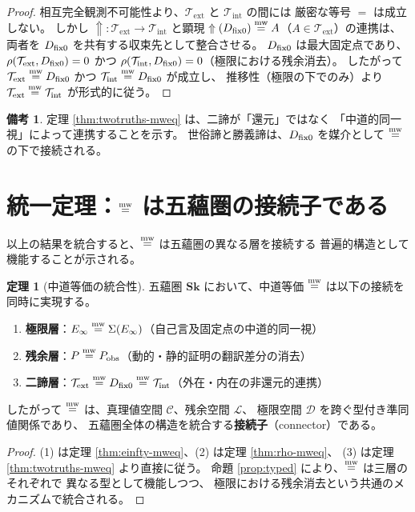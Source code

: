\documentclass[11pt,a4paper]{article}
\theoremstyle{definition}
\newtheorem{theorem}{定理}[section]
\newtheorem{remark}{備考}[section]
\newcommand{\Sk}{\mathbf{Sk}}
\newcommand{\C}{\mathcal{C}}
\newcommand{\Lspace}{\mathcal{L}}
\newcommand{\Dspace}{\mathcal{D}}
\newcommand{\T}{\mathcal{T}}
\newcommand{\TExt}{\T_{\mathrm{ext}}}
\newcommand{\TInt}{\T_{\mathrm{int}}}
\newcommand{\SelfRef}{\Sigma}
\newcommand{\Einfty}{E_{\infty}}
\begin{document}
\begin{proof}
相互完全観測不可能性より、$\TExt$ と $\TInt$ の間には
厳密な等号 $=$ は成立しない。
しかし $\Uparrow:\TExt\to\TInt$ と顕現
$\Uparrow(D_{\mathrm{fix}0})\mathrel{\overset{\mathrm{mw}}{=}} A$（$A\in\TExt$）の連携は、
両者を $D_{\mathrm{fix}0}$ を共有する収束先として整合させる。
$D_{\mathrm{fix}0}$ は最大固定点であり、
$\rho(\TExt,\dfix)=0$ かつ $\rho(\TInt,\dfix)=0$（極限における残余消去）。
したがって $\TExt\mweq\dfix$ かつ $\TInt\mweq\dfix$ が成立し、
推移性（極限の下でのみ）より $\TExt\mweq\TInt$ が形式的に従う。
\end{proof}

\begin{remark}
定理 \ref{thm:twotruths-mweq} は、二諦が「還元」ではなく
「中道的同一視」によって連携することを示す。
世俗諦と勝義諦は、$D_{\mathrm{fix}0}$ を媒介として $\mathrel{\overset{\mathrm{mw}}{=}}$ の下で接続される。
\end{remark}

\section{統一定理：\texorpdfstring{$\mathrel{\overset{\mathrm{mw}}{=}}$}{mw-equivalence} は五蘊圏の接続子である}

以上の結果を統合すると、$\mathrel{\overset{\mathrm{mw}}{=}}$ は五蘊圏の異なる層を接続する
普遍的構造として機能することが示される。

\begin{theorem}[中道等価の統合性]\label{thm:unification}
五蘊圏 $\Sk$ において、中道等価 $\mathrel{\overset{\mathrm{mw}}{=}}$ は以下の接続を同時に実現する。
\begin{enumerate}[label=(\arabic*)]
  \item \textbf{極限層}：$\Einfty \mweq \SelfRef(\Einfty)$（自己言及固定点の中道的同一視）
  \item \textbf{残余層}：$P \mathrel{\overset{\mathrm{mw}}{=}} P_{\mathrm{obs}}$（動的・静的証明の翻訳差分の消去）
  \item \textbf{二諦層}：$\TExt \mweq \dfix \mweq \TInt$（外在・内在の非還元的連携）
\end{enumerate}
したがって $\mathrel{\overset{\mathrm{mw}}{=}}$ は、真理値空間 $\C$、残余空間 $\Lspace$、
極限空間 $\Dspace$ を跨ぐ型付き準同値関係であり、
五蘊圏全体の構造を統合する\textbf{接続子}（connector）である。
\end{theorem}

\begin{proof}
(1) は定理 \ref{thm:einfty-mweq}、(2) は定理 \ref{thm:rho-mweq}、
(3) は定理 \ref{thm:twotruths-mweq} より直接に従う。
命題 \ref{prop:typed} により、$\mathrel{\overset{\mathrm{mw}}{=}}$ は三層のそれぞれで
異なる型として機能しつつ、
極限における残余消去という共通のメカニズムで統合される。
\end{proof}
\end{document}
